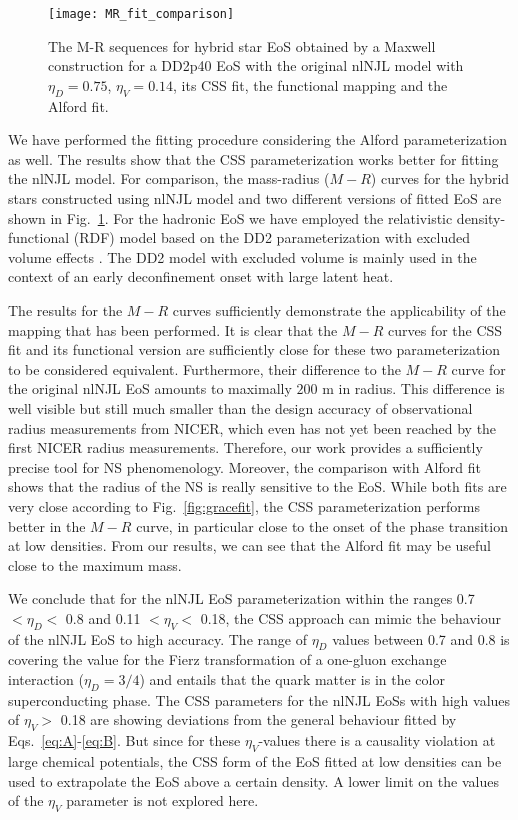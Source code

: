 \documentclass[%
 reprint,
superscriptaddress,
nofootinbib,
 amsmath,amssymb,
 aps,
]{revtex4-1}
\begin{document}
\begin{figure}[!htb]
    \texttt{[image: MR\_fit\_comparison]}
\caption{
The M-R sequences for hybrid star EoS obtained by a Maxwell construction for a DD2p40 EoS with the original nlNJL model with $\eta_D = 0.75$, $\eta_V = 0.14$, its CSS fit, the functional mapping and the Alford fit.}
\label{fig:massradius}
\end{figure}

We have performed the fitting procedure considering the Alford parameterization as well. The results show that the CSS parameterization works better for fitting the nlNJL model. For comparison, the mass-radius ($M-R$) curves for the hybrid stars constructed using nlNJL model and two different versions of fitted EoS are shown in Fig.~\ref{fig:massradius}. For the hadronic EoS we have employed the relativistic density-functional (RDF) model based on the DD2 parameterization \cite{Typel:2009sy} with excluded volume effects \cite{Typel:2016srf}. The DD2 model with excluded
volume is mainly used in the context of an early deconfinement onset with large latent heat. 

The results for the $M-R$ curves sufficiently demonstrate the applicability of the mapping that has been performed. It is clear that the $M-R$ curves for the CSS fit and its functional version are sufficiently close for these two parameterization to be considered equivalent. Furthermore, their difference to the $M-R$ curve for the original nlNJL EoS amounts to maximally $200$ m in radius. This difference is well visible but still much smaller than the design accuracy of observational radius measurements from NICER, which even has not yet been reached by the first 
NICER radius measurements. Therefore, our work provides a sufficiently precise tool for NS phenomenology. Moreover, the comparison with Alford fit shows that the radius of the NS is really sensitive to the EoS. While both fits are very close according to Fig.~\ref{fig:gracefit}, the CSS parameterization performs better in the $M-R$ curve, in particular close to the onset of the phase transition at low densities. From our results, we can see that the Alford fit may be useful close to the maximum mass.

We conclude that for the nlNJL EoS parameterization within the ranges 0.7 $< \eta_D <$ 0.8 and 0.11 $< \eta_V <$ 0.18, the CSS approach can mimic the behaviour of the nlNJL EoS to high accuracy. The range of $\eta_D$ values between 0.7 and 0.8 is 
covering the value for the Fierz transformation of a one-gluon exchange interaction ($\eta_D = 3/4$) and entails that the quark matter is in the color superconducting phase. The CSS parameters for the nlNJL EoSs with high values of $\eta_V >$ 0.18 are showing deviations from the general behaviour fitted by Eqs.~\eqref{eq:A}-\eqref{eq:B}. But since for these $\eta_V$-values there is a causality  violation at large chemical potentials, the CSS form of the EoS fitted at low densities can be used to extrapolate the EoS above a certain density. A lower limit on the values of the $\eta_V$ parameter 
is not explored here.
\end{document}
